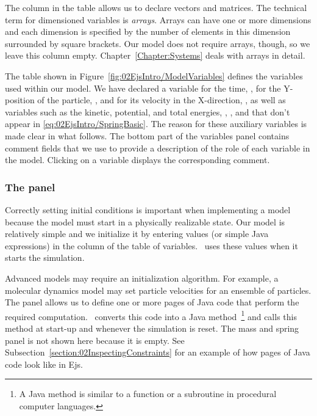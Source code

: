 The  column in the table allows us to declare vectors and matrices. The technical term for dimensioned
variables is \emph{arrays}. Arrays can have one or more dimensions and each dimension is specified by the number of
elements in this dimension surrounded by square brackets. Our model does not require arrays, though, so we leave this
column empty. Chapter~\ref{Chapter:Systems} deals with arrays in detail.

The table shown in Figure~\ref{fig:02EjsIntro/ModelVariables} defines the variables used within our model.  We have
declared a variable for the time, , for the Y-position of the particle, , and for its velocity in the
X-direction, , as well as variables such as the kinetic, potential, and total energies, , ,
and  that don't appear in \eqref{eq:02EjsIntro/SpringBasic}. The reason for these auxiliary variables is made
clear in what follows. The bottom part of the variables panel contains comment fields that we use to provide a
description of the role of each variable in the model. Clicking on a variable displays the corresponding comment.

\subsubsection{The  panel}

Correctly setting initial conditions is important when implementing a model because the model must start in a
physically realizable state. Our model is relatively simple and we initialize it by entering values (or simple Java
expressions) in the  column of the table of variables. \ejs\ uses these values when it starts the
simulation.

Advanced models may require an initialization algorithm. For example, a molecular dynamics model may set particle
velocities for an ensemble of particles. The  panel allows us to define one or more pages of Java
code that perform the required computation. \ejs\ converts this code into a Java
method~\footnote{A Java method is similar to a function or a subroutine in procedural computer languages.}
and calls this method at start-up and whenever the simulation is reset. The mass and spring  panel is not
shown here because it is empty. See Subsection~\ref{section:02InspectingConstraints} for an example of how
pages of Java code look like in Ejs.



